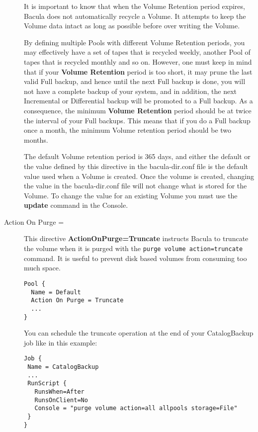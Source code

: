 \begin{description}
   It is important to know that when the Volume Retention period expires, 
   Bacula does not automatically recycle a Volume. It attempts to keep the
   Volume data intact as long as possible before over writing the Volume.
   
   By defining multiple Pools with different Volume Retention periods, you
   may effectively have a set of tapes that is recycled weekly, another
   Pool of tapes that is recycled monthly and so on.  However, one must
   keep in mind that if your {\bf Volume Retention} period is too short, it
   may prune the last valid Full backup, and hence until the next Full
   backup is done, you will not have a complete backup of your system, and
   in addition, the next Incremental or Differential backup will be
   promoted to a Full backup.  As a consequence, the minimum {\bf Volume
   Retention} period should be at twice the interval of your Full backups.
   This means that if you do a Full backup once a month, the minimum Volume
   retention period should be two months.
   
   The default Volume retention period is 365 days, and either the default
   or the value defined by this directive in the bacula-dir.conf file is
   the default value used when a Volume is created.  Once the volume is
   created, changing the value in the bacula-dir.conf file will not change
   what is stored for the Volume.  To change the value for an existing
   Volume you must use the {\bf update} command in the Console.

\item [Action On Purge = \lt{Truncate}]

This directive \textbf{ActionOnPurge=Truncate} instructs Bacula to truncate the
volume when it is purged with the \texttt{purge volume action=truncate}
command. It is useful to prevent disk based volumes from consuming too much
space.

\begin{verbatim}
Pool {
  Name = Default
  Action On Purge = Truncate
  ...
}
\end{verbatim}

You can schedule the truncate operation at the end of your CatalogBackup job
like in this example:

\begin{verbatim}
Job {
 Name = CatalogBackup
 ...
 RunScript {
   RunsWhen=After
   RunsOnClient=No
   Console = "purge volume action=all allpools storage=File"
 }
}
\end{verbatim}


\end{description}
